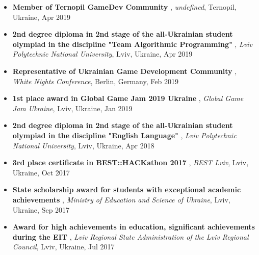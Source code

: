 \documentclass[letterpaper,10pt]{article}
\newcommand{\titleItem}[1]{
  \textbf{#1}
}
\begin{document}
\begin{itemize}[leftmargin=0.15in, label={}]
    \item
			\titleItem{Member of Ternopil GameDev Community}, \emph{undefined}, {Ternopil, Ukraine}, Apr 2019
			\vspace{-9pt}
		
    \item
			\titleItem{2nd degree diploma in 2nd stage of the all-Ukrainian student olympiad in the discipline "Team Algorithmic Programming"}, \emph{Lviv Polytechnic National University}, {Lviv, Ukraine}, Apr 2019
			\vspace{-9pt}
		
    \item
			\titleItem{Representative of Ukrainian Game Development Community}, \emph{White Nights Conference}, {Berlin, Germany}, Feb 2019
			\vspace{-9pt}
		
    \item
			\titleItem{1st place award in Global Game Jam 2019 Ukraine}, \emph{Global Game Jam Ukraine}, {Lviv, Ukraine}, Jan 2019
			\vspace{-9pt}
		
    \item
			\titleItem{2nd degree diploma in 2nd stage of the all-Ukrainian student olympiad in the discipline "English Language"}, \emph{Lviv Polytechnic National University}, {Lviv, Ukraine}, Apr 2018
			\vspace{-9pt}
		
    \item
			\titleItem{3rd place certificate in BEST::HACKathon 2017}, \emph{BEST Lviv}, {Lviv, Ukraine}, Oct 2017
			\vspace{-9pt}
		
    \item
			\titleItem{State scholarship award for students with exceptional academic achievements}, \emph{Ministry of Education and Science of Ukraine}, {Lviv, Ukraine}, Sep 2017
			\vspace{-9pt}
		
    \item
			\titleItem{Award for high achievements in education, significant achievements during the EIT}, \emph{Lviv Regional State Administration of the Lviv Regional Council}, {Lviv, Ukraine}, Jul 2017
			\vspace{-9pt}
		
    \end{itemize}
	

\end{document}

